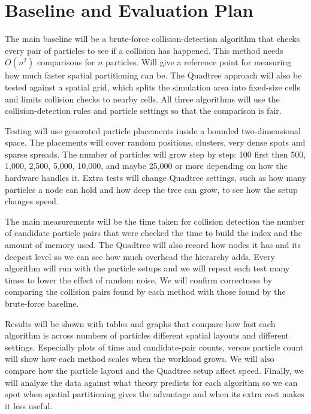 \section*{Baseline and Evaluation Plan}

The main baseline will be a brute-force collision-detection algorithm that checks every pair of
particles to see if a collision has happened. This method needs $O({n}^{2})$ comparisons for $n$ particles. Will
give a reference point for measuring how much faster spatial partitioning can be. The Quadtree
approach will also be tested against a spatial grid, which splits the simulation area into fixed-size cells
and limits collision checks to nearby cells. All three algorithms will use the collision-detection rules and
particle settings so that the comparison is fair.

Testing will use generated particle placements inside a bounded two-dimensional space. The
placements will cover random positions, clusters, very dense spots and sparse spreads. The number of
particles will grow step by step: 100 first then 500, 1,000, 2,500, 5,000, 10,000, and maybe 25,000 or
more depending on how the hardware handles it. Extra tests will change Quadtree settings, such as how
many particles a node can hold and how deep the tree can grow, to see how the setup changes speed.

The main measurements will be the time taken for collision detection the number of candidate
particle pairs that were checked the time to build the index and the amount of memory used. The
Quadtree will also record how nodes it has and its deepest level so we can see how much overhead the hierarchy
adds. Every algorithm will run with the particle setups and we will repeat each test many times to lower the effect
of random noise. We will confirm correctness by comparing the collision pairs found by each method with those found
by the brute-force baseline.

Results will be shown with tables and graphs that compare how fast each algorithm is across
numbers of particles different spatial layouts and different settings. Especially plots of time and
candidate-pair counts, versus particle count will show how each method scales when the workload
grows. We will also compare how the particle layout and the Quadtree setup affect speed. Finally, we
will analyze the data against what theory predicts for each algorithm so we can spot when spatial
partitioning gives the advantage and when its extra cost makes it less useful.


